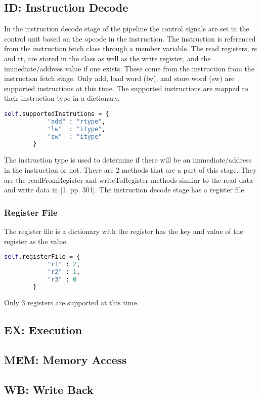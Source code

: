 \documentclass[conference]{IEEEtran}
\begin{document}
\subsection{ID: Instruction Decode}
In the instruction decode stage of the pipeline the control signals are set in the control unit based on the opcode in the instruction.  The instruction is referenced from the instruction fetch class through a member variable.  The read registers, rs and rt, are stored in the class as well as the write register, and the immediate/address value if one exists.  These come from the instruction from the instruction fetch stage.  Only add, load word (lw), and store word (sw) are supported instructions at this time.  The supported instructions are mapped to their instruction type in a dictionary.
\begin{lstlisting}[language=Python]
self.supportedInstrutions = {
            "add" : "rtype",
            "lw"  : "itype",
            "sw"  : "itype"
        }
\end{lstlisting}
The instruction type is used to determine if there will be an immediate/address in the instruction or not.  There are 2 methods that are a part of this stage.  They are the readFromRegister and writeToRegister methods simliar to the read data and write data in [1, pp. 301].
The instruction decode stage has a register file.

\subsubsection{Register File}
The register file is a dictionary with the register has the key and value of the register as the value.
\begin{lstlisting}[language=Python]
self.registerFile = {
            "r1" : 2,
            "r2" : 1,
            "r3" : 0
        }
\end{lstlisting}
Only 3 registers are supported at this time.

\subsection{EX: Execution}

\subsection{MEM: Memory Access}

\subsection{WB: Write Back}
\end{document}
